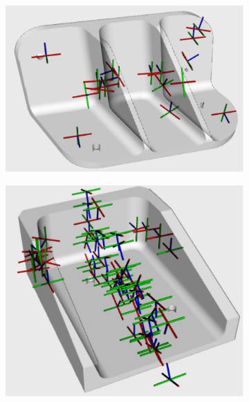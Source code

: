 \begin{figure}[h!]
{\begin{tcolorbox}
\begin{subfigure}[c]{.23\textwidth}
         \centering
         \includegraphics[trim={0cm 0cm 0cm 0cm},clip,width=1\linewidth,angle=0]{Cap5/Figuras/candidates_plot/reinforced_bracket_candidates.pdf}
         \caption{}
         \label{fig:reinforced_bracket_candidates}
      \end{subfigure}
      \hfill
      \begin{subfigure}[c]{.23\textwidth}
         \centering
         \includegraphics[trim={0cm 0cm 0cm 0cm},clip,width=1\linewidth,angle=0]{Cap5/Figuras/candidates_plot/single_side_bracket_candidates.pdf}
         \caption{}
         \label{fig:single_side_bracket_candidates}
      \end{subfigure}

\end{tcolorbox}}
\end{figure}
